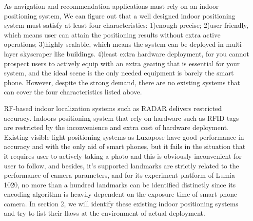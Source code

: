 \documentclass[conference]{IEEEtran}
\begin{document}
	As navigation and recommendation applications must rely on an indoor positioning system, We can figure out that a well designed indoor positioning system must satisfy at least four characteristics: 1)enough precise; 2)user friendly, which means user can attain the positioning results without extra active operations; 3)highly scalable, which means the system can be deployed in multi-layer skyscraper like buildings. 4)least extra hardware deployment, for you cannot prospect users to actively equip with an extra gearing that is essential for your system, and the ideal scene is the only needed equipment is barely the smart phone. However, despite the strong demand, there are no existing systems that can cover the four characteristics listed above.
	
	RF-based indoor localization systems such as RADAR delivers restricted accuracy. Indoors positioning system that rely on hardware such as RFID tags are restricted by the inconvenience and extra cost of hardware deployment. Existing visible light positioning systems as Luxapose have good performance in accuracy and with the only aid of smart phones, but it fails in the situation that it requires user to actively taking a photo and this is obviously inconvenient for user to follow, and besides, it's supported landmarks are strictly related to the performance of camera parameters, and for its experiment platform of Lumia 1020, no more than a hundred landmarks can be identified distinctly since its encoding algorithm is heavily dependent on the exposure time of smart phone camera. In section 2, we will identify these existing indoor positioning systems and try to list their flaws at the environment of actual deployment.
\end{document}
